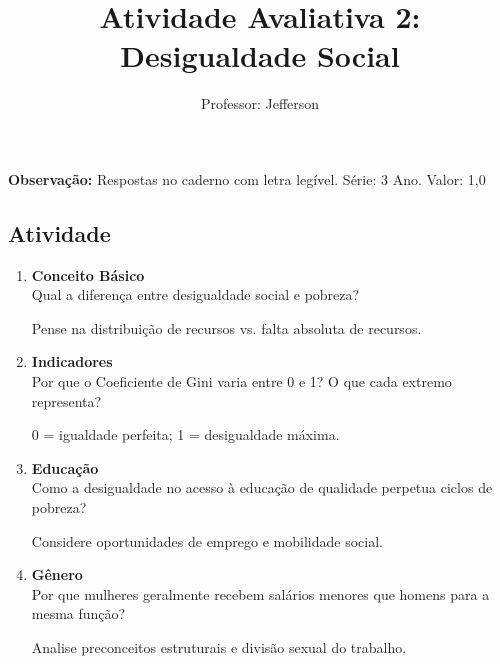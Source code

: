 \documentclass[11pt]{article}
\title{\textcolor{titleblue}{Atividade Avaliativa 2: Desigualdade Social}}
\author{Professor: Jefferson}
\date{}
\begin{document}
\maketitle
\vspace{-1cm}

\begin{center}
    \large{\textbf{Observação:} Respostas no caderno com letra legível. \quad Série: 3 Ano. Valor: 1,0}
\end{center}

\begin{multicols}{2}

\section*{Atividade}
\begin{enumerate}

\item \textbf{Conceito Básico}\\
Qual a diferença entre desigualdade social e pobreza?
\begin{tcolorbox}[colback=explanationbg,colframe=titleblue,title=Dica:]
Pense na distribuição de recursos vs. falta absoluta de recursos.
\end{tcolorbox}

\item \textbf{Indicadores}\\
Por que o Coeficiente de Gini varia entre 0 e 1? O que cada extremo representa?
\begin{tcolorbox}[colback=explanationbg,colframe=titleblue,title=Dica:]
0 = igualdade perfeita; 1 = desigualdade máxima.
\end{tcolorbox}

\item \textbf{Educação}\\
Como a desigualdade no acesso à educação de qualidade perpetua ciclos de pobreza?
\begin{tcolorbox}[colback=explanationbg,colframe=titleblue,title=Dica:]
Considere oportunidades de emprego e mobilidade social.
\end{tcolorbox}

\item \textbf{Gênero}\\
Por que mulheres geralmente recebem salários menores que homens para a mesma função?
\begin{tcolorbox}[colback=explanationbg,colframe=titleblue,title=Dica:]
Analise preconceitos estruturais e divisão sexual do trabalho.
\end{tcolorbox}


\end{enumerate}
\end{multicols}
\end{document}
